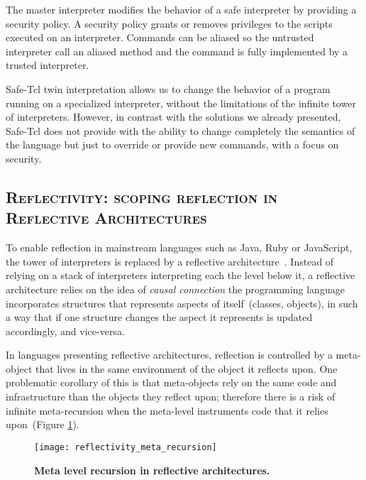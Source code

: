 The master interpreter modifies the behavior of a safe interpreter by providing a security policy. A security policy grants or removes privileges to the scripts executed on an interpreter. Commands can be aliased so the untrusted interpreter call an aliased method and the command is fully implemented by a trusted interpreter.

Safe-Tcl twin interpretation allows us to change the behavior of a program running on a specialized interpreter, without the limitations of the infinite tower of interpreters. However, in contrast with the solutions we already presented, Safe-Tcl does not provide with the ability to change completely the semantics of the language but just to override or provide new commands, with a focus on security.

\subsection*{\textsc{Reflectivity: scoping reflection in Reflective Architectures}}

To enable reflection in mainstream languages such as Java, Ruby or JavaScript, the tower of interpreters is replaced by a reflective architecture~\cite{Maes87a}. Instead of relying on a stack of interpreters interpreting each the level below it, a reflective architecture relies on the idea of \emph{causal connection} \ie the programming language incorporates structures that represents aspects of itself~(\eg classes, objects), in such a way that if one structure changes the aspect it represents is updated accordingly, and vice-versa.


In languages presenting reflective architectures, reflection is controlled by a meta-object that lives in the same environment of the object it reflects upon.
One problematic corollary of this is that meta-objects rely on the same code and infrastructure than the objects they reflect upon; therefore there is a risk of infinite meta-recursion when the meta-level instruments code that it relies upon~(Figure \ref{fig:reflectivity_meta_recursion}).

\begin{figure}[ht]
\begin{center}
\texttt{[image: reflectivity\_meta\_recursion]}
\caption{\textbf{Meta level recursion in reflective architectures.}\label{fig:reflectivity_meta_recursion}
 }
\end{center}
\end{figure}

